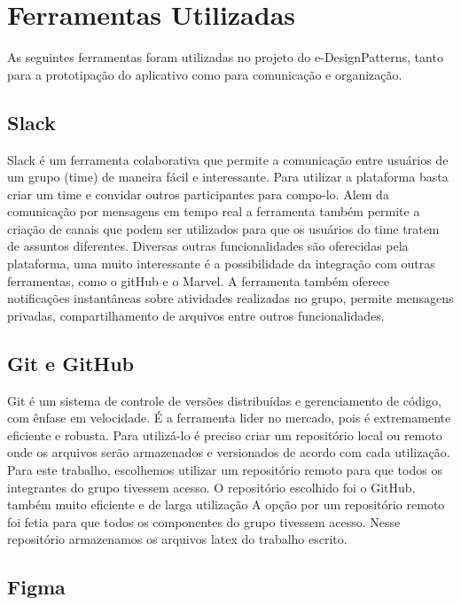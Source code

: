 \section{Ferramentas Utilizadas}

As seguintes ferramentas foram utilizadas no projeto do e-DesignPatterns, tanto para a prototipação do aplicativo como para comunicação e organização.

\subsection{Slack}
Slack \cite{slack} é um ferramenta colaborativa que permite a comunicação entre usuários de um grupo (time) de maneira fácil e interessante. Para utilizar a plataforma basta criar um time e convidar outros participantes para compo-lo. Alem da comunicação por mensagens em tempo real a ferramenta também permite a criação de canais que podem ser utilizados para que os usuários do time tratem de assuntos diferentes. Diversas outras funcionalidades são oferecidas pela plataforma, uma muito interessante é a possibilidade da integração com outras ferramentas, como o gitHub e o Marvel.  A ferramenta também oferece notificações instantâneas sobre atividades realizadas no grupo, permite mensagens privadas, compartilhamento de arquivos entre outros funcionalidades.

\subsection{Git e GitHub}

Git \cite{git} é um sistema de controle de versões distribuídas e gerenciamento de código, com ênfase em velocidade. É a ferramenta lider no mercado, pois é extremamente eficiente e robusta. Para utilizá-lo é preciso criar um repositório local ou remoto onde os arquivos serão armazenados e versionados de acordo com cada utilização. Para este trabalho, escolhemos utilizar um repositório remoto para que todos os integrantes do grupo tivessem acesso. O repositório escolhido foi o GitHub, também muito eficiente e de larga utilização A opção por um repositório remoto foi fetia para que todos os componentes do grupo tivessem acesso. Nesse repositório armazenamos os arquivos latex do trabalho escrito.

\subsection{Figma}

